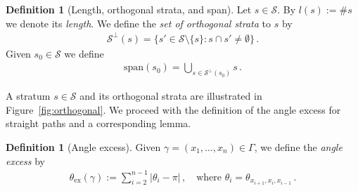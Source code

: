 \documentclass[reqno]{amsart}
\theoremstyle{plain}
\theoremstyle{definition}
\newtheorem{definition}[theorem]{Definition}
\numberwithin{equation}{section}
\begin{document}
  \begin{definition}[Length, orthogonal strata, and span]\label{def: strata-ort} Let $s \in \mathcal{S}$.
  By $l(s):= \# s$ we denote its \emph{length}. We define the \emph{set of orthogonal strata} to $s$ by
\begin{align*}
\mathcal{S}^\perp(s)=\{s' \in \mathcal{S} \setminus \{s\} \colon s\cap s'\neq \emptyset\}\,.
\end{align*}
Given $s_0 \in \mathcal{S}$ we define
\begin{align}\label{def:span}
\mathrm{span}(s_0) = \bigcup_{s \in \mathcal{S}^\perp(s_0)}s\,.
\end{align}
\end{definition}
 A stratum $s \in \mathcal{S}$ and its orthogonal strata are illustrated in Figure~\ref{fig:orthogonal}.  We proceed with the definition of the angle excess for straight paths and a corresponding lemma.   
\begin{definition}[Angle excess] Given $\gamma=(x_1,\ldots,x_n) \in \Gamma$, we define the \emph{angle excess} by
\begin{align*}
\theta_{\mathrm{ex}}(\gamma) := \sum^{n-1}_{i=2} |\theta_i-\pi|\,, \quad \text{where $\theta_i =\theta_{x_{i+1},x_i,x_{i-1}}$}\,. 
\end{align*}
\end{definition}



 
\end{document}
